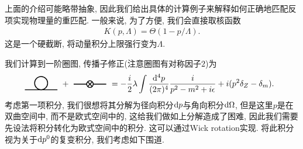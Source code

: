 上面的介绍可能略带抽象, 因此我们给出具体的计算例子来解释如何正确地匹配反项实现物理量的重匹配. 一般来说, 为了方便, 我们会直接取核函数
\begin{align}
    K(p, \Lambda)=\Theta(1-p/\Lambda).
\end{align}
这是一个硬截断, 将动量积分上限强行变为$\Lambda$.

我们计算到一阶圈图, 传播子修正(注意圈图有对称因子$2$)为
\begin{align}
    \vcenter{\hbox{
        \begin{tikzpicture}[line width=1pt, scale=0.7, baseline=-0.1cm]
            \draw (-1,0) -- (1,0);
            \draw (0,0.4) circle (0.4);
        \end{tikzpicture}
    }}+\vcenter{\hbox{
        \begin{tikzpicture}[line width=1pt, scale=0.7, baseline=-0.1cm]
            \draw (-1,0) -- (1,0);
            \fill[white] (0,0) circle (0.2);
            \draw (0,0) circle (0.2);
            \draw (-0.14,-0.14) -- (0.14,0.14);
            \draw (-0.14,0.14) -- (0.14,-0.14);
        \end{tikzpicture}
    }}&=-\frac i2\lambda\int\dddd p\frac i{p^2-m^2+i\epsilon}+i(p^2\delta_Z-\delta_m).
\end{align}
考虑第一项积分, 我们很想将其分解为径向积分$\mathrm d p$与角向积分$\mathrm d\Omega$, 但是这里$p$是在双曲空间中, 而不是欧式空间中的, 这给我们做如上分解造成了困难, 因此我们需要先设法将积分转化为欧式空间中的积分. 这可以通过Wick rotation实现. 将此积分视为关于$\mathrm d p^0$的复变积分, 我们考虑如下围道.

